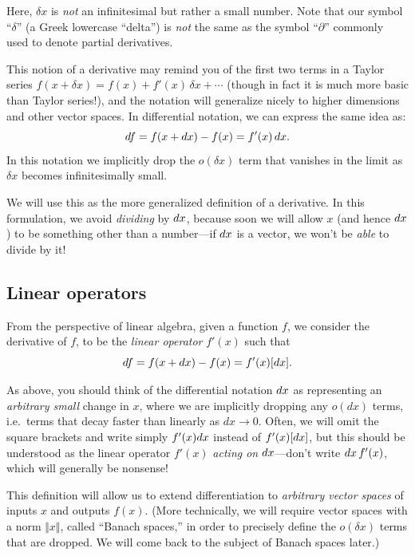 \begin{remark}
Here, $\delta x$ is \emph{not} an infinitesimal but rather a small number.  Note that our symbol ``$\delta$'' (a Greek lowercase ``delta'') is \emph{not} the same as the symbol ``$\partial$'' commonly used to denote partial derivatives.
\end{remark}

This notion of a derivative may remind you of the first two terms in a Taylor series $f(x+\delta x) = f(x) + f'(x) \, \delta x + \cdots$ (though in fact it is much more basic than Taylor series!), and the notation will generalize nicely to higher dimensions and other vector spaces. In differential notation, we can express the same idea as:
\[
d f = f(x+d x) - f(x) = f'(x) \, d x.
\]
In this notation we implicitly drop the $o(\delta x)$ term that vanishes in the limit as $\delta x$ becomes infinitesimally small.



We will use this as the more generalized definition of a derivative.
 In this formulation, we avoid \emph{dividing} by $d x$, because soon we will allow $x$ (and hence $d x$) to be something other than a number---if $d x$ is a vector, we won't be \emph{able} to divide by it!

\subsection{Linear operators}

From the perspective of linear algebra, given a function $f$, we consider the derivative of $f$, to be the \emph{linear operator} $f'(x)$ such that
\[
d f = f(x+ d x) - f(x) = f'(x)[d x].
\]

As above, you should think of the differential notation $d x$ as representing an \emph{arbitrary small} change in $x$, where we are implicitly dropping any $o(dx)$ terms, i.e.~terms that decay faster than linearly as $dx\to 0$.  Often, we will omit the square brackets and write simply $f'(x)d x$ instead of $f'(x)[d x]$, but this should be understood as the linear operator $f'(x)$ \emph{acting on} $d x$---don't write $d x\,f'(x)$, which will generally be nonsense!

This definition will allow us to extend differentiation to \emph{arbitrary vector spaces} of inputs $x$ and outputs $f(x)$.  (More technically, we will require vector spaces with a norm $\Vert x \Vert$, called ``Banach spaces,'' in order to precisely define the $o(\delta x)$ terms that are dropped.  We will come back to the subject of Banach spaces later.)

